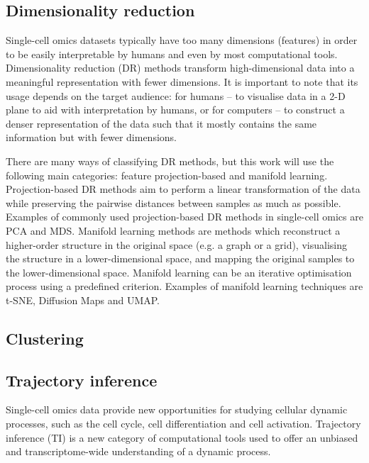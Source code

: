 \subsection{Dimensionality reduction}
Single-cell omics datasets typically have too many dimensions (features) in order to be easily interpretable by humans and even by most computational tools. 
Dimensionality reduction (DR) methods transform high-dimensional data into a meaningful representation with fewer dimensions. It is important to note that its usage depends on the target audience: for humans -- to visualise data in a 2-D plane to aid with interpretation by humans, or for computers -- to construct a denser representation of the data such that it mostly contains the same information but with fewer dimensions.

There are many ways of classifying DR methods\cite{engel_surveydimensionreduction_2012}, but this work will use the following main categories: feature projection-based and manifold learning. 
Projection-based DR methods aim to perform a linear transformation of the data while preserving the pairwise distances between samples as much as possible. Examples of commonly used projection-based DR methods in single-cell omics are PCA and MDS. 
Manifold learning methods are methods which reconstruct a higher-order structure in the original space (e.g. a graph or a grid), visualising the structure in a lower-dimensional space, and mapping the original samples to the lower-dimensional space. Manifold learning can be an iterative optimisation process using a predefined criterion. Examples of manifold learning techniques are t-SNE, Diffusion Maps and UMAP. 


\subsection{Clustering}

\subsection{Trajectory inference}
Single-cell omics data provide new opportunities for studying cellular dynamic processes, such as the cell cycle, cell differentiation and cell activation\cite{tanay_scalingsinglecellgenomics_2017,etzrodt_quantitativesinglecellapproaches_2014}. 
Trajectory inference (TI) is a new category of computational tools used to offer an unbiased and transcriptome-wide understanding of a dynamic process\cite{tanay_scalingsinglecellgenomics_2017,cannoodt_computationalmethodstrajectory_2016}. 

